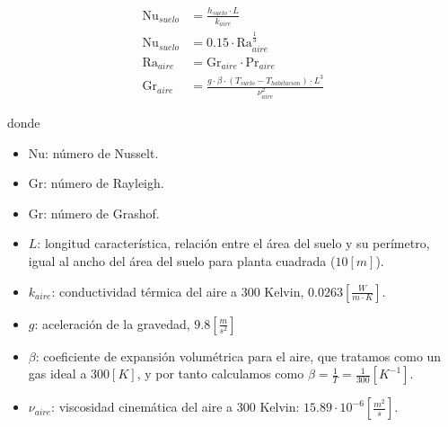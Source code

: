 \begin{align}
	\text{Nu}_{suelo} & = \frac{h_{suelo} \cdot L}{k_{aire}} \label{eq:h_suelo}                                 \\
	\text{Nu}_{suelo} & = 0.15 \cdot \text{Ra}_{aire}^{\frac{1}{3}}  \label{eq:empirical_nu_natural_convection} \\
	\text{Ra}_{aire}  & = \text{Gr}_{aire} \cdot \text{Pr}_{aire}                                               \\
	\text{Gr}_{aire}  & = \frac{g \cdot \beta \cdot ( T_{suelo} - T_{habitacion} ) \cdot L^3}{\nu_{aire}^2}
\end{align}


donde

\begin{itemize}
	\item $\text{Nu}$: número de Nusselt.
	\item $\text{Gr}$: número de Rayleigh.
	\item $\text{Gr}$: número de Grashof.
	\item $L$: longitud característica, relación entre el área del suelo y su
	      perímetro, igual al ancho del área del suelo para planta cuadrada
	      ($10[m]$).
	\item $k_{aire}$: conductividad térmica del aire a 300 Kelvin, $0.0263\left[ \frac{W}{m \cdot K} \right]$.
	\item $g$: aceleración de la gravedad, $9.8\left[\frac{m}{s^2}\right]$
	\item $\beta$: coeficiente de expansión volumétrica para el aire, que
	      tratamos como un gas ideal a $300[K]$, y por tanto calculamos como $\beta =
		      \frac{1}{T} = \frac{1}{300} \left[K^{-1}\right]$.
	\item $\nu_{aire}$: viscosidad cinemática del aire a 300 Kelvin: $15.89 \cdot 10^{-6} \left[\frac{m^2}{s}\right]$.
\end{itemize}
